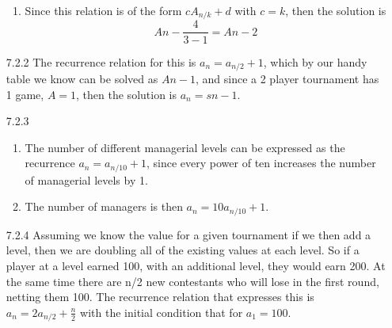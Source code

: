 \documentclass{article}
\begin{document}
\begin{enumerate}
\begin{enumerate}
\item

Since this relation is of the form $cA_{n/k}+d$ with $c=k$, then the solution is
\[
An-\frac{4}{3-1} = An-2
\]
\end{enumerate}

\item[7.2.2]
The recurrence relation for this is $a_n=a_{n/2}+1$, which by our handy table we know can be solved as $An-1$, and since a 2 player tournament has 1 game, $A=1$, then the solution is $a_n=sn-1$. 

\item[7.2.3]
\begin{enumerate}
\item
The number of different managerial levels can be expressed as the recurrence $a_n=a_{n/10}+1$, since every power of ten increases the number of managerial levels by 1. 
\item
The number of managers is then $a_n=10a_{n/10}+1$. 
\end{enumerate}

\item[7.2.4]
Assuming we know the value for a given tournament if we then add a level, then we are doubling all of the existing values at each level. So if a player at a level earned 100, with an additional level, they would earn 200. At the same time there are n/2 new contestants who will lose in the first round, netting them 100. The recurrence relation that expresses this is $a_n = 2a_{n/2} + \frac{n}{2}$ with the initial condition that for $a_1 = 100$. 

\end{enumerate}
\end{document}
